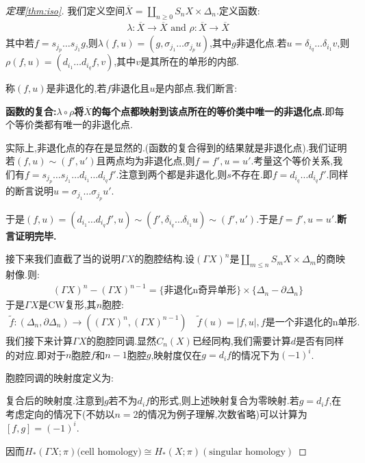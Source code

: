 \begin{proof}[定理\ref{thm:iso}]
    我们定义空间$\overline{X}=\coprod_{n\geq 0}S_nX \times \Delta_n$.定义函数:
    \begin{align*}
        \lambda:\overline{X} \to \overline{X} \text{  and  } \rho:\overline{X} \to \overline{X}
    \end{align*}
    其中若$f=s_{j_p}\dots s_{j_1}g$,则$\lambda(f,u)=(g,\sigma_{j_1}\dots \sigma_{j_p}u)$,其中$g$非退化点.若$u=\delta_{i_q}\dots \delta_{i_1}v$,则$\rho(f,u)=(d_{i_1}\dots d_{i_q}f,v)$,其中$v$是其所在的单形的内部.

    称$(f,u)$是非退化的,若$f$非退化且$u$是内部点.我们断言:

    \textbf{函数的复合:$\lambda \circ \rho$将$\overline{X}$的每个点都映射到该点所在的等价类中唯一的非退化点.}即每个等价类都有唯一的非退化点.

    实际上,非退化点的存在是显然的.(函数的复合得到的结果就是非退化点).我们证明若$(f,u) \sim (f',u')$且两点均为非退化点,则$f=f',u=u'$.考量这个等价关系,我们有$f=s_{j_p}\dots s_{j_1}\dots d_{i_1}\dots d_{i_q}f'$.注意到两个都是非退化,则$s$不存在.即$f=d_{i_q}\dots d_{i_q}f'$.同样的断言说明$u=\sigma_{j_1}\dots \sigma_{j_p}u'$.

    于是$(f,u)=(d_{i_1}\dots d_{i_q}f',u)\sim (f',\delta_{i_q}\dots \delta_{i_1}u)\sim (f',u')$.于是$f=f',u=u'$.\textbf{断言证明完毕.}
     
    接下来我们直截了当的说明$\Gamma X$的胞腔结构.设$(\Gamma X)^n$是$\coprod_{m \leq n}S_m X \times \Delta_m$的商映射像.则:
    \begin{align*}
        (\Gamma X)^n-(\Gamma X)^{n-1}=\{ \text{非退化n奇异单形}\} \times \{\Delta_n -\partial \Delta_n\}
    \end{align*}
    于是$\Gamma X$是CW复形,其$n$胞腔:
    \begin{align*}
        \tilde{f}:(\Delta_n,\partial \Delta_n) \to ((\Gamma X)^n,(\Gamma X)^{n-1}) \quad \tilde{f}(u)=|f,u|, f\text{是一个非退化的n单形.}
    \end{align*}
    我们接下来计算$\Gamma X$的胞腔同调.显然$C_n(X)$已经同构,我们需要计算$d$是否有同样的对应.即对于$n$胞腔$f$和$n-1$胞腔$g$,映射度仅在$g=d_if$的情况下为$(-1)^i$.

    胞腔同调的映射度定义为:

 
    复合后的映射度.注意到$g$若不为$d_if$的形式,则上述映射复合为零映射.若$g=d_if$,在考虑定向的情况下(不妨以$n=2$的情况为例子理解,次数省略)可以计算为$[f,g]=(-1)^i$.

    因而$H_*(\Gamma X;\pi)\text{(cell homology)} \cong H_*(X;\pi)(\text{singular homology})$
\end{proof}
